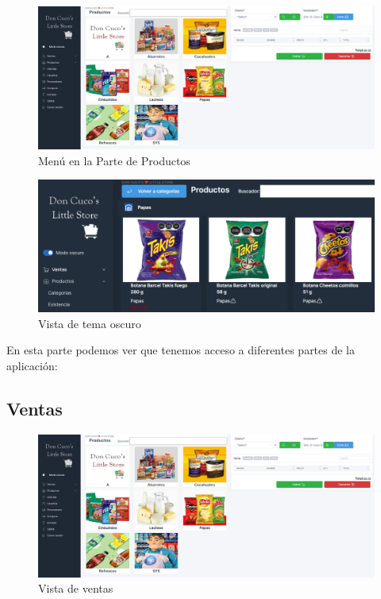 \documentclass[a4paper,DIV=12]{scrreprt}
\begin{document}
	\begin{figure}[!htb]
		\centering
		\includegraphics[scale=0.3]{VENTAS.PNG}
		\caption{Menú en la Parte de Productos}
	\end{figure}

	\begin{figure}[!htb]
		\centering
		\includegraphics[scale=0.4]{TEMAOSCURO.PNG}
		\caption{Vista de tema oscuro}
	\end{figure}
	
En esta parte podemos ver que tenemos acceso a diferentes partes de la aplicación:\\
\clearpage 

\subsection{Ventas}

	\begin{figure}[!htb]
		\centering
		\includegraphics[scale=0.3]{VENTAS.PNG}
		\caption{Vista de ventas}
	\end{figure}
	
\end{document}
